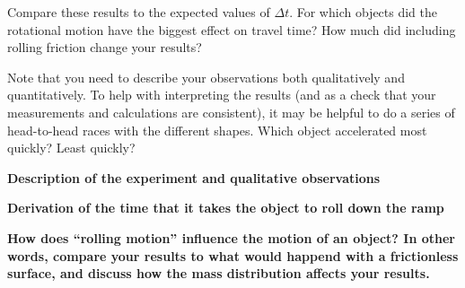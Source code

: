 \documentclass[11pt,letterpaper]{article}
\begin{document}
Compare these results to the expected values of $\Delta{t}$. For which objects did the rotational motion have the biggest effect on travel time? How much did including rolling friction change your results?

Note that you need to describe your observations both qualitatively and quantitatively. To help with interpreting the results (and as a check that your measurements and calculations are consistent), it may be helpful to do a series of head-to-head races with the different shapes. Which object accelerated most quickly? Least quickly?

{\bf Description of the experiment and qualitative observations}

\clearpage
{\bf Derivation of the time that it takes the object to roll down the ramp}
\vspace{10cm}

\vspace{5cm}

{\bf How does ``rolling motion'' influence the motion of an object? In other words, compare your results to what would happend with a frictionless surface, and discuss how the mass distribution affects your results.}
\end{document}
